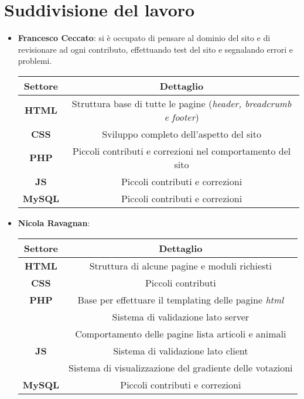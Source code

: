 \section{Suddivisione del lavoro}
\label{sec:organization}

\begin{itemize}
    \item \textbf{Francesco Ceccato}: si è occupato di pensare al dominio del sito e di revisionare ad ogni contributo, effettuando test del sito e segnalando errori e problemi.
    \begin{center}
        \begin{tabular}{| c | c |}
            \hline
            \textbf{Settore} & \textbf{Dettaglio}  \\ [0.5ex]
            \hline \hline
            \textbf{HTML} & Struttura base di tutte le pagine (\textit{header, breadcrumb e footer}) \\
            \hline
            \textbf{CSS} & Sviluppo completo dell'aspetto del sito \\
            \hline
            \textbf{PHP} & Piccoli contributi e correzioni nel comportamento del sito \\
            \hline
            \textbf{JS} & Piccoli contributi e correzioni \\
            \hline
            \textbf{MySQL} & Piccoli contributi e correzioni \\
            \hline
        \end{tabular}
    \end{center}

    \item \textbf{Nicola Ravagnan}: 
    \begin{center}
        \begin{tabular}{| c | c |}
            \hline
            \textbf{Settore} & \textbf{Dettaglio}  \\ [0.5ex]
            \hline \hline
            \textbf{HTML} & Struttura di alcune pagine e moduli richiesti \\
            \hline
            \textbf{CSS} & Piccoli contributi \\
            \hline
            \textbf{PHP} & Base per effettuare il templating delle pagine \textit{html} \\
             & Sistema di validazione lato server \\
             & Comportamento delle pagine lista articoli e animali \\
             \hline
            \textbf{JS} & Sistema di validazione lato client \\
             & Sistema di visualizzazione del gradiente delle votazioni \\
            \hline
            \textbf{MySQL} & Piccoli contributi e correzioni \\
            \hline
        \end{tabular}
    \end{center}


\end{itemize}

